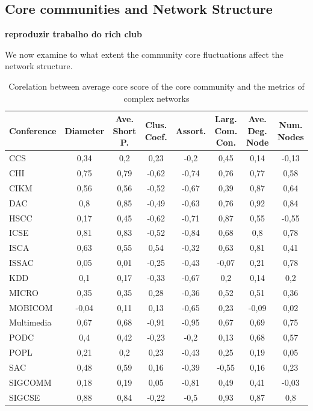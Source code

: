 \subsection{Core communities and Network Structure}
{\bf reproduzir trabalho do rich club \cite{Xu:2010}}

We now examine to what extent the community core fluctuations affect the network structure.


\begin{table}[!htb]
\centering
\caption{Corelation between average core score of the core community and the metrics of complex networks}
\label{tab:correlation_metrics}
{\small
\begin{tabular}{|l|c|c|c|c|c|c|c|} \hline
Conference & Diameter & Ave. Short P. & Clus. Coef. & Assort. & Larg. Com. Con. & Ave. Deg. Node & Num. Nodes\\ \hline
CCS & 0,34 & 0,2 & 0,23 & -0,2 & 0,45 & 0,14 & -0,13\\ \hline
CHI & 0,75 & 0,79 & -0,62 & -0,74 & 0,76 & 0,77 & 0,58\\ \hline
CIKM & 0,56 & 0,56 & -0,52 & -0,67 & 0,39 & 0,87 & 0,64\\ \hline
DAC & 0,8 & 0,85 & -0,49 & -0,63 & 0,76 & 0,92 & 0,84\\ \hline
HSCC & 0,17 & 0,45 & -0,62 & -0,71 & 0,87 & 0,55 & -0,55\\ \hline
ICSE & 0,81 & 0,83 & -0,52 & -0,84 & 0,68 & 0,8 & 0,78\\ \hline
ISCA & 0,63 & 0,55 & 0,54 & -0,32 & 0,63 & 0,81 & 0,41\\ \hline
ISSAC & 0,05 & 0,01 & -0,25 & -0,43 & -0,07 & 0,21 & 0,78\\ \hline
KDD & 0,1 & 0,17 & -0,33 & -0,67 & 0,2 & 0,14 & 0,2\\ \hline
MICRO & 0,35 & 0,35 & 0,28 & -0,36 & 0,52 & 0,51 & 0,36\\ \hline
MOBICOM & -0,04 & 0,11 & 0,13 & -0,65 & 0,23 & -0,09 & 0,02\\ \hline
Multimedia & 0,67 & 0,68 & -0,91 & -0,95 & 0,67 & 0,69 & 0,75\\ \hline
PODC & 0,4 & 0,42 & -0,23 & -0,2 & 0,13 & 0,68 & 0,57\\ \hline
POPL & 0,21 & 0,2 & 0,23 & -0,43 & 0,25 & 0,19 & 0,05\\ \hline
SAC & 0,48 & 0,59 & 0,16 & -0,39 & -0,55 & 0,16 & 0,23\\ \hline
SIGCOMM & 0,18 & 0,19 & 0,05 & -0,81 & 0,49 & 0,41 & -0,03\\ \hline
SIGCSE & 0,88 & 0,84 & -0,22 & -0,5 & 0,93 & 0,87 & 0,8\\ \hline

\end{tabular}}
\end{table}
